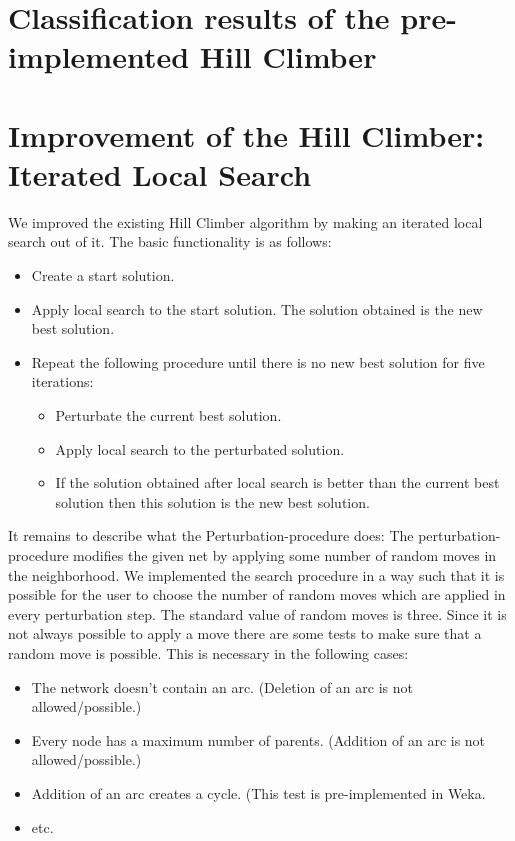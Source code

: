 \documentclass[paper=a4, fontsize=11pt]{scrartcl} %
\numberwithin{equation}{section} %
\numberwithin{figure}{section} %
\numberwithin{table}{section} %
\begin{document}
\section{Classification results of the pre-implemented Hill Climber}


\section{Improvement of the Hill Climber: Iterated Local Search}

We improved the existing Hill Climber algorithm by making an iterated local search out of it. The basic functionality is as follows:

\begin{itemize}
	\item Create a start solution.
	\item Apply local search to the start solution. The solution obtained is the new best solution.
	\item Repeat the following procedure until there is no new best solution for five iterations:
		\begin{itemize}
			\item Perturbate the current best solution.
			\item Apply local search to the perturbated solution.
			\item If the solution obtained after local search is better than the current best solution then this solution is the new best solution.
		\end{itemize}
\end{itemize}

It remains to describe what the Perturbation-procedure does: The perturbation-procedure modifies the given net by applying some number of random moves in the neighborhood. We implemented the search procedure in a way such that it is possible for the user to choose the number of random moves which are applied in every perturbation step. The standard value of random moves is three. Since it is not always possible to apply a move there are some tests to make sure that a random move is possible. This is necessary in the following cases:

\begin{itemize}
	\item The network doesn't contain an arc. (Deletion of an arc is not allowed/possible.)
	\item Every node has a maximum number of parents. (Addition of an arc is not allowed/possible.)
	\item Addition of an arc creates a cycle. (This test is pre-implemented in Weka.
	\item etc.
\end{itemize}
\end{document}
